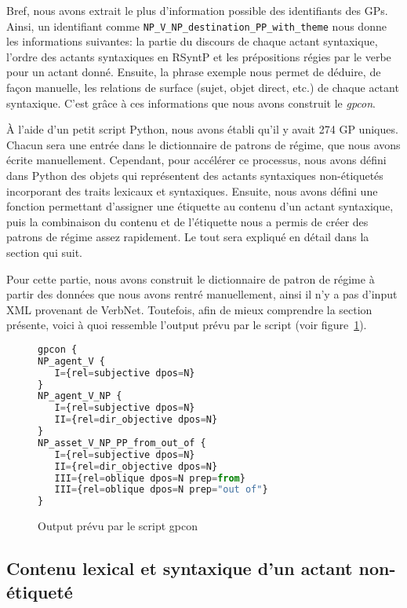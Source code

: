 Bref, nous avons extrait le plus d'information possible des identifiants des \acp{GP}. Ainsi, un identifiant comme \texttt{NP\_V\_NP\_destination\_PP\_with\_theme} nous donne les informations suivantes: la partie du discours de chaque actant syntaxique, l'ordre des actants syntaxiques en \ac{RSyntP} et les prépositions régies par le verbe pour un actant donné. Ensuite, la phrase exemple  nous permet de déduire, de façon manuelle, les relations de surface (sujet, objet direct, etc.) de chaque actant syntaxique. C'est grâce à ces informations que nous avons construit le \emph{gpcon}.

À l'aide d'un petit script Python, nous avons établi qu'il y avait 274 \ac{GP} uniques. Chacun sera une entrée dans le dictionnaire de patrons de régime, que nous avons écrite manuellement. Cependant, pour accélérer ce processus, nous avons défini dans Python des objets qui représentent des actants syntaxiques non-étiquetés incorporant des traits lexicaux et syntaxiques. Ensuite, nous avons défini une fonction permettant d'assigner une étiquette au contenu d'un actant syntaxique, puis la combinaison du contenu et de l'étiquette nous a permis de créer des patrons de régime assez rapidement. Le tout sera expliqué en détail dans la section qui suit.

Pour cette partie, nous avons construit le dictionnaire de patron de régime à partir des données que nous avons rentré manuellement, ainsi il n'y a pas d'input XML provenant de VerbNet. Toutefois, afin de mieux comprendre la section présente, voici à quoi ressemble l'output prévu par le script (voir figure~\ref{fig:outputgpcon}).

\begin{figure}[htb]
  \caption{Output prévu par le script gpcon}
	\label{fig:outputgpcon}
\begin{lstlisting}[language=Python]
gpcon {
NP_agent_V {
   I={rel=subjective dpos=N}
}
NP_agent_V_NP {
   I={rel=subjective dpos=N}
   II={rel=dir_objective dpos=N}
}
NP_asset_V_NP_PP_from_out_of {
   I={rel=subjective dpos=N}
   II={rel=dir_objective dpos=N}
   III={rel=oblique dpos=N prep=from}
   III={rel=oblique dpos=N prep="out of"}
}
\end{lstlisting}
\end{figure}
\subsection{Contenu lexical et syntaxique d'un actant non-étiqueté}

